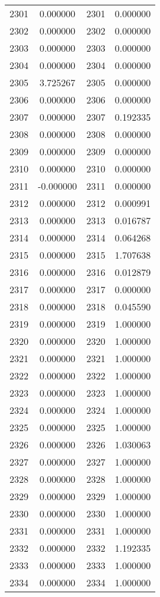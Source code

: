 \documentclass[12pt]{article}
\begin{document}
\begin{longtable}{@{}cccc@{}}
2301 & 0.000000 & 2301 & 0.000000 \\
2302 & 0.000000 & 2302 & 0.000000 \\
2303 & 0.000000 & 2303 & 0.000000 \\
2304 & 0.000000 & 2304 & 0.000000 \\
2305 & 3.725267 & 2305 & 0.000000 \\
2306 & 0.000000 & 2306 & 0.000000 \\
2307 & 0.000000 & 2307 & 0.192335 \\
2308 & 0.000000 & 2308 & 0.000000 \\
2309 & 0.000000 & 2309 & 0.000000 \\
2310 & 0.000000 & 2310 & 0.000000 \\
2311 & -0.000000 & 2311 & 0.000000 \\
2312 & 0.000000 & 2312 & 0.000991 \\
2313 & 0.000000 & 2313 & 0.016787 \\
2314 & 0.000000 & 2314 & 0.064268 \\
2315 & 0.000000 & 2315 & 1.707638 \\
2316 & 0.000000 & 2316 & 0.012879 \\
2317 & 0.000000 & 2317 & 0.000000 \\
2318 & 0.000000 & 2318 & 0.045590 \\
2319 & 0.000000 & 2319 & 1.000000 \\
2320 & 0.000000 & 2320 & 1.000000 \\
2321 & 0.000000 & 2321 & 1.000000 \\
2322 & 0.000000 & 2322 & 1.000000 \\
2323 & 0.000000 & 2323 & 1.000000 \\
2324 & 0.000000 & 2324 & 1.000000 \\
2325 & 0.000000 & 2325 & 1.000000 \\
2326 & 0.000000 & 2326 & 1.030063 \\
2327 & 0.000000 & 2327 & 1.000000 \\
2328 & 0.000000 & 2328 & 1.000000 \\
2329 & 0.000000 & 2329 & 1.000000 \\
2330 & 0.000000 & 2330 & 1.000000 \\
2331 & 0.000000 & 2331 & 1.000000 \\
2332 & 0.000000 & 2332 & 1.192335 \\
2333 & 0.000000 & 2333 & 1.000000 \\
2334 & 0.000000 & 2334 & 1.000000 \\

\end{longtable}
\end{document}
